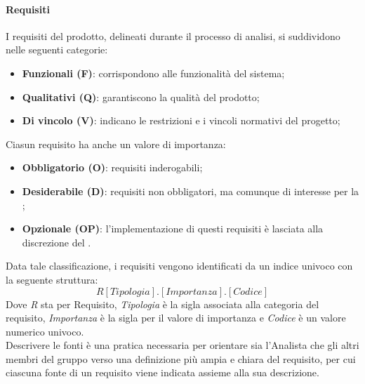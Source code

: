 \paragraph{Requisiti}
I requisiti del prodotto, delineati durante il processo di analisi, si suddividono nelle seguenti categorie:
\begin{itemize}
  \item \textbf{Funzionali (F)}: corrispondono alle funzionalità del sistema;
  \item \textbf{Qualitativi (Q)}: garantiscono la qualità del prodotto;
  \item \textbf{Di vincolo (V)}: indicano le restrizioni e i vincoli normativi del progetto;
\end{itemize}
Ciasun requisito ha anche un valore di importanza:
\begin{itemize}
  \item \textbf{Obbligatorio (O)}: requisiti inderogabili;
  \item \textbf{Desiderabile (D)}: requisiti non obbligatori, ma comunque di interesse per la ;
  \item \textbf{Opzionale (OP)}: l'implementazione di questi requisiti è lasciata alla discrezione del .
\end{itemize}
Data tale classificazione, i requisiti vengono identificati da un indice univoco con la seguente struttura:
\[R[Tipologia].[Importanza].[Codice]\]
Dove \emph{R} sta per Requisito, \emph{Tipologia} è la sigla associata alla categoria del requisito, \emph{Importanza} è la sigla per il valore di importanza e \emph{Codice} è un valore numerico univoco.\\
Descrivere le fonti è una pratica necessaria per orientare sia l'Analista che gli altri membri del gruppo verso una definizione più ampia e chiara del requisito, per cui ciascuna fonte di un requisito viene indicata assieme alla sua descrizione.

